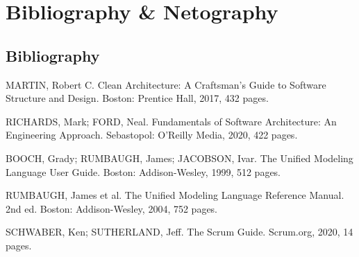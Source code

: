 \documentclass[12pt,a4paper,oneside]{report}
\begin{document}
\chapter*{Bibliography \& Netography}

\section*{Bibliography}
\begingroup\sloppy
\begin{enumerate}[label={[\arabic*]}]
\item MARTIN, Robert C. Clean Architecture: A Craftsman's Guide to Software Structure and Design. Boston: Prentice Hall, 2017, 432 pages.
\item RICHARDS, Mark; FORD, Neal. Fundamentals of Software Architecture: An Engineering Approach. Sebastopol: O'Reilly Media, 2020, 422 pages.
\item BOOCH, Grady; RUMBAUGH, James; JACOBSON, Ivar. The Unified Modeling Language User Guide. Boston: Addison-Wesley, 1999, 512 pages.
\item RUMBAUGH, James et al. The Unified Modeling Language Reference Manual. 2nd ed. Boston: Addison-Wesley, 2004, 752 pages.
\item SCHWABER, Ken; SUTHERLAND, Jeff. The Scrum Guide. Scrum.org, 2020, 14 pages.
\end{enumerate}
\end{document}
